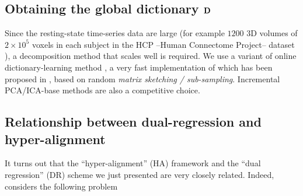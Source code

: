 \subsection{Obtaining the global dictionary $\mathbf{D}$}
Since the resting-state time-series data are large (for example $1200$ 3D volumes of
$2 \times 10^5$ voxels in each subject in the HCP --Human Connectome Project-- dataset \citep{VanEssen20122222}), a decomposition
method that scales well is required. We use a variant of online
dictionary-learning method \citep{mairal2010}, a very fast
implementation of which has been proposed in
\citep{mensch2016dictionary}, based on random \textit{matrix sketching
  / sub-sampling}.
Incremental PCA/ICA-base methods\citep{smith2014group,varoquaux2010group} are also a competitive choice.



\subsection{Relationship between dual-regression and hyper-alignment}
\label{sec:haIsDr}
It turns out that the ``hyper-alignment'' (HA) framework \citep{haxby2011} and the ``dual regression'' (DR) scheme
\citep{tavor2016task} we just presented are very closely related.
Indeed,  \citep{haxby2011} considers the following problem

